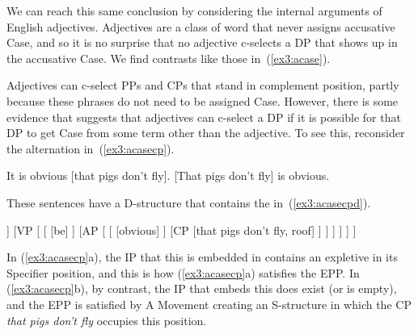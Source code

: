 We can reach this same conclusion by considering the internal arguments of English adjectives. Adjectives are a class of word that never assigns accusative Case, and so it is no surprise that no adjective c-selects a DP that shows up in the accusative Case. We find contrasts like those in~(\ref{ex3:acase}).
\pagebreak
\begin{exe}
	\raggedright
	\ex \label{ex3:acase} 
	\begin{xlist}
	\end{xlist}
\end{exe}
Adjectives can c-select PPs and CPs that stand in complement position, partly because these phrases do not need to be assigned Case. However, there is some evidence that suggests that adjectives can c-select a DP if it is possible for that DP to get Case from some term other than the adjective. To see this, reconsider the alternation in~(\ref{ex3:acasecp}).
\begin{exe}
	\raggedright
	\ex \label{ex3:acasecp} 
	\begin{xlist}
		\ex It is obvious [\CP that pigs don't fly].
		\ex{} [\CP That pigs don't fly] is obvious.
	\end{xlist}
\end{exe}
These sentences have a D-structure that contains the  in~(\ref{ex3:acasecpd}).
\begin{exe}
	\raggedright
	\ex \label{ex3:acasecpd} 
	\small
	\begin{forest}
	[\ibar{I}
		[\obar{I} [pres] ]
		[VP [
			[ [be] ]
			[AP [ 
				[ [obvious] ]
				[CP [that pigs don't fly, roof] ]
			] ]
		] ]
	]
	\end{forest}
\end{exe}
In (\ref{ex3:acasecp}a), the IP that this  is embedded in contains an expletive in its Specifier position, and this is how (\ref{ex3:acasecp}a) satisfies the EPP. In (\ref{ex3:acasecp}b), by contrast, the IP that embeds this  does exist (or is empty), and the EPP is satisfied by A Movement creating an S-structure in which the CP \emph{that pigs don't fly} occupies this position.

